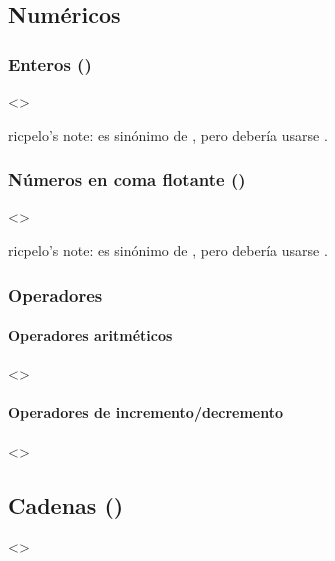 \documentclass[a4paper,12pt,spanish]{sphinxmanual}
\begin{document}
\subsection{Numéricos}
\label{\detokenize{php:numericos}}

\subsubsection{Enteros ()}
\label{\detokenize{php:enteros-int}}
\textless{}\textgreater{}

ricpelo’s note:  es sinónimo de , pero debería usarse
.


\subsubsection{Números en coma flotante ()}
\label{\detokenize{php:numeros-en-coma-flotante-float}}
\textless{}\textgreater{}

ricpelo’s note:  es sinónimo de , pero debería usarse
.


\subsubsection{Operadores}
\label{\detokenize{php:id3}}

\paragraph{Operadores aritméticos}
\label{\detokenize{php:operadores-aritmeticos}}
\textless{}\textgreater{}


\paragraph{Operadores de incremento/decremento}
\label{\detokenize{php:operadores-de-incremento-decremento}}
\textless{}\textgreater{}


\subsection{Cadenas ()}
\label{\detokenize{php:cadenas-string}}
\textless{}\textgreater{}
\end{document}
